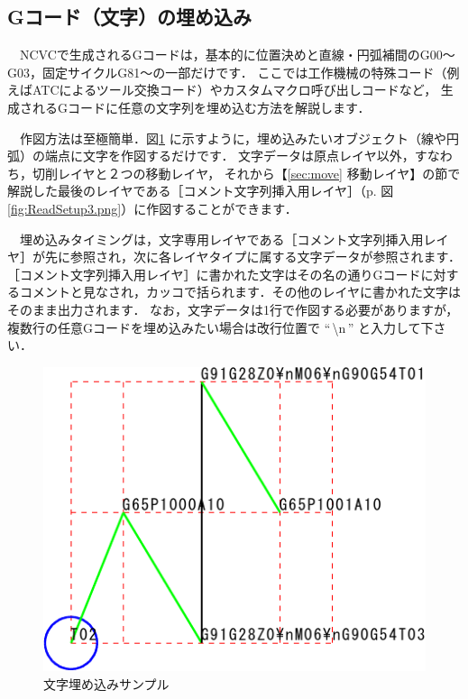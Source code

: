 \subsection{Gコード（文字）の埋め込み}
\label{sec:moji}
　NCVCで生成されるGコードは，基本的に位置決めと直線・円弧補間のG00～G03，固定サイクルG81～の一部だけです．
ここでは工作機械の特殊コード（例えばATCによるツール交換コード）やカスタムマクロ呼び出しコードなど，
生成されるGコードに任意の文字列を埋め込む方法を解説します．

\begin{minipage}[t]{0.5\textwidth}
　作図方法は至極簡単．図\ref{fig:moji.pdf} に示すように，埋め込みたいオブジェクト（線や円弧）の端点に文字を作図するだけです．
文字データは原点レイヤ以外，すなわち，切削レイヤと２つの移動レイヤ，
それから【\ref{sec:move} 移動レイヤ】の節で解説した最後のレイヤである［コメント文字列挿入用レイヤ］（p.\pageref{fig:ReadSetup3.png} 図\ref{fig:ReadSetup3.png}）に作図することができます．

　埋め込みタイミングは，文字専用レイヤである［コメント文字列挿入用レイヤ］が先に参照され，次に各レイヤタイプに属する文字データが参照されます．
［コメント文字列挿入用レイヤ］に書かれた文字はその名の通りGコードに対するコメントと見なされ，カッコで括られます．その他のレイヤに書かれた文字はそのまま出力されます．
なお，文字データは1行で作図する必要がありますが，複数行の任意Gコードを埋め込みたい場合は改行位置で ``\,\textbackslash n\,'' と入力して下さい．
\end{minipage}
\begin{minipage}[t]{0.5\textwidth}
\vspace*{-1zh}
\begin{figure}[H]
\centering
\includegraphics{No3/fig/moji-crop.pdf}
\caption{文字埋め込みサンプル}
\label{fig:moji.pdf}
\end{figure}
\end{minipage}

